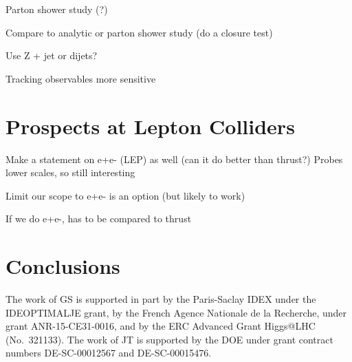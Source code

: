 \documentclass[11pt,letterpaper]{article}
\begin{document}
Parton shower study (?)

	Compare to analytic or parton shower study (do a closure test)

	Use Z + jet or dijets?



	Tracking observables more sensitive

\section{Prospects at Lepton Colliders}

	Make a statement on e+e- (LEP) as well (can it do better than thrust?)
		Probes lower scales, so still interesting

	Limit our scope to e+e- is an option (but likely to work)

	If we do e+e-, has to be compared to thrust

\section{Conclusions}

\begin{acknowledgments}

The work of GS is supported in part by the Paris-Saclay IDEX under the
IDEOPTIMALJE grant, by the French Agence Nationale de la Recherche,
under grant ANR-15-CE31-0016, and by the ERC Advanced Grant Higgs@LHC
(No.\ 321133).
%
The work of JT is supported by the DOE under grant contract numbers DE-SC-00012567 and DE-SC-00015476.

\end{acknowledgments}



\end{document}
